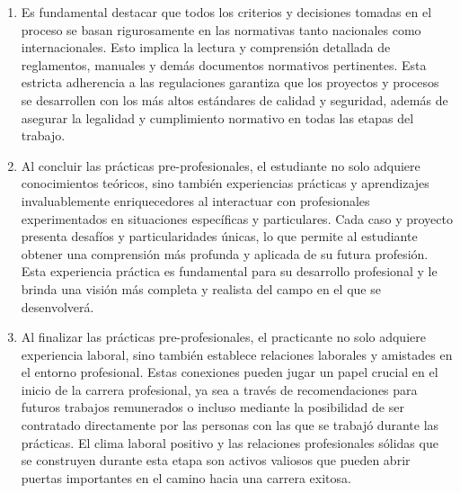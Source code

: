 \begin{enumerate}
	\item Es fundamental destacar que todos los criterios y decisiones tomadas en el proceso se basan rigurosamente en las normativas tanto nacionales como internacionales. Esto implica la lectura y comprensión detallada de reglamentos, manuales y demás documentos normativos pertinentes. Esta estricta adherencia a las regulaciones garantiza que los proyectos y procesos se desarrollen con los más altos estándares de calidad y seguridad, además de asegurar la legalidad y cumplimiento normativo en todas las etapas del trabajo.

	\item  Al concluir las prácticas pre-profesionales, el estudiante no solo adquiere conocimientos teóricos, sino también experiencias prácticas y aprendizajes invaluablemente enriquecedores al interactuar con profesionales experimentados en situaciones específicas y particulares. Cada caso y proyecto presenta desafíos y particularidades únicas, lo que permite al estudiante obtener una comprensión más profunda y aplicada de su futura profesión. Esta experiencia práctica es fundamental para su desarrollo profesional y le brinda una visión más completa y realista del campo en el que se desenvolverá.

	\item Al finalizar las prácticas pre-profesionales, el practicante no solo adquiere experiencia laboral, sino también establece relaciones laborales y amistades en el entorno profesional. Estas conexiones pueden jugar un papel crucial en el inicio de la carrera profesional, ya sea a través de recomendaciones para futuros trabajos remunerados o incluso mediante la posibilidad de ser contratado directamente por las personas con las que se trabajó durante las prácticas. El clima laboral positivo y las relaciones profesionales sólidas que se construyen durante esta etapa son activos valiosos que pueden abrir puertas importantes en el camino hacia una carrera exitosa.
\end{enumerate}